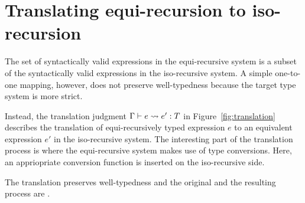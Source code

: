 \section{Translating equi-recursion to iso-recursion}

The set of syntactically valid expressions in the equi-recursive system is a
subset of the syntactically valid expressions in the iso-recursive system. A
simple one-to-one mapping, however, does not preserve well-typedness because
the target type system is more strict.



Instead, the translation judgment $\translation e {e'} T$ in
Figure~\ref{fig:translation} describes the translation of equi-recursively
typed expression $e$ to an equivalent expression $e'$ in the iso-recursive
system. The interesting part of the translation process is where the
equi-recursive system makes use of type conversions. Here, an appriopriate
conversion function is inserted on the iso-recursive side.

The translation preserves well-typedness and the original and the
resulting process are .  

% 
%   
% 
% 
% 
% 

